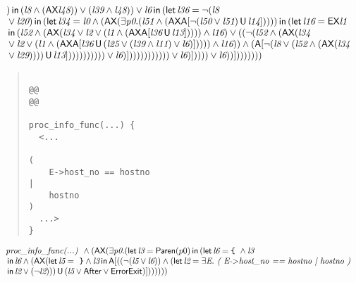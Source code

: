 \documentclass{article}
\newcommand{\U}{\,\mbox{\sf{U}}\,}
\newcommand{\A}{\mbox{\sf{A}}}
\newcommand{\AX}{\mbox{\sf{AX}}}
\newcommand{\EX}{\mbox{\sf{EX}}}
\newcommand{\mita}[1]{\mbox{\it{{#1}}}}
\newcommand{\msf}[1]{\mbox{\sf{{#1}}}}
\newcommand{\mth}[1]{\({#1}\)}
\newcommand{\ttlb}{\mbox{\tt \char'173}}
\newcommand{\ttrb}{\mbox{\tt \char'175}}
\begin{document}
\[\begin{array}{l}
) \, \mita{\sf{in}} \, (\mita{l8} \wedge (\AX\mita{l48})) \vee (\mita{l39} \wedge \mita{l48})
) \vee \mita{l6} \, \mita{\sf{in}} \, (\mita{\sf{let}} \, \mita{l36} = \neg (\mita{l8}\\\mbox{} \vee \mita{l20}) \, \mita{\sf{in}} \, (\mita{\sf{let}} \, \mita{l34} = \mita{l0} \wedge (\AX(\exists \mita{p0} . (\mita{l51} \wedge (\AX\A[\neg (\mita{l50} \vee \mita{l51}) \U \mita{l14}]
)))) \, \mita{\sf{in}} \, (\mita{\sf{let}} \, \mita{l16} = \EX\mita{l1}\\\mbox{} \, \mita{\sf{in}} \, (\mita{l52} \wedge (\AX(\mita{l34} \vee \mita{l2} \vee (\mita{l1} \wedge (\AX\A[\mita{l36} \U \mita{l13}]
)))) \wedge \mita{l16}) \vee ((\neg (\mita{l52} \wedge (\AX(\mita{l34}\\\mbox{} \vee \mita{l2} \vee (\mita{l1} \wedge (\AX\A[\mita{l36} \U (\mita{l25} \vee (\mita{l39} \wedge \mita{l11}) \vee \mita{l6})]
)))) \wedge \mita{l16})) \wedge (\A[\neg (\mita{l8} \vee (\mita{l52} \wedge (\AX(\mita{l34}\\\mbox{} \vee \mita{l29})))) \U \mita{l13}]
))
)
)
)
)
)
)
)
) \vee \mita{l6})]

)
)
)
)
)
)
)
)
))) \vee \mita{l6})]

)))) \vee \mita{l6}
)
)]

))
)
))))
\end{array}\]

\begin{quote}\begin{verbatim}

@@
@@

proc_info_func(...) {
  <...
    
(
    E->host_no == hostno
|
    hostno
)
  ...>
}
\end{verbatim}\end{quote}

\[\begin{array}{l}
\mita{proc\_info\_func(...) } \wedge (\AX(\exists \mita{p0} . (\mita{\sf{let}} \, \mita{l3} = \msf{Paren}(p0) \, \mita{\sf{in}} \, (\mita{\sf{let}} \, \mita{l6} = \mita{{\ttlb}
  } \wedge \mita{l3}\\\mbox{} \, \mita{\sf{in}} \, \mita{l6} \wedge (\AX(\mita{\sf{let}} \, \mita{l5} = \mita{
{\ttrb}} \wedge \mita{l3} \, \mita{\sf{in}} \, \A[((\neg (\mita{l5} \vee \mita{l6})) \wedge (\mita{\sf{let}} \, \mita{l2} = \exists \mita{E} . \mita{
(
E-\mth{>}host\_no == hostno
|
hostno
)}\\\mbox{} \, \mita{\sf{in}} \, \mita{l2} \vee (\neg \mita{l2})
)) \U (\mita{l5} \vee \msf{After} \vee \msf{ErrorExit})]

))
)
)))
\end{array}\]
\end{document}
